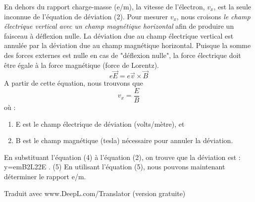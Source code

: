 \documentclass[../main.tex]{subfiles}
\begin{document}
En dehors du rapport charge-masse (e/m), la vitesse de l'électron, $v_x$, est la seule inconnue de l'équation de déviation (2).  Pour mesurer $v_x$, nous croisons \textit{le champ électrique vertical avec un champ magnétique horizontal} afin de produire un faisceau à déflexion nulle.  La déviation due au champ électrique vertical est annulée par la déviation due au champ magnétique horizontal.  Puisque la somme des forces externes est nulle en cas de "déflexion nulle", la force électrique doit être égale à la force magnétique (force de Lorentz).\\
$$e\overrightarrow{E} = e\overrightarrow{v} \times \overrightarrow{B}$$
A partir de cette équation, nous trouvons que\\
$$v_x = \frac{E}{B}$$
où :\\
\begin{enumerate}
    \item E est le champ électrique de déviation (volts/mètre), et 
    \item B est le champ magnétique (tesla) nécessaire pour annuler la déviation. 
\end{enumerate}
En substituant l'équation (4) à l'équation (2), on trouve que la déviation est : y=emB2L22E .                  (5) En utilisant l'équation (5), nous pouvons maintenant déterminer le rapport e/m. 

Traduit avec www.DeepL.com/Translator (version gratuite)
\end{document}
